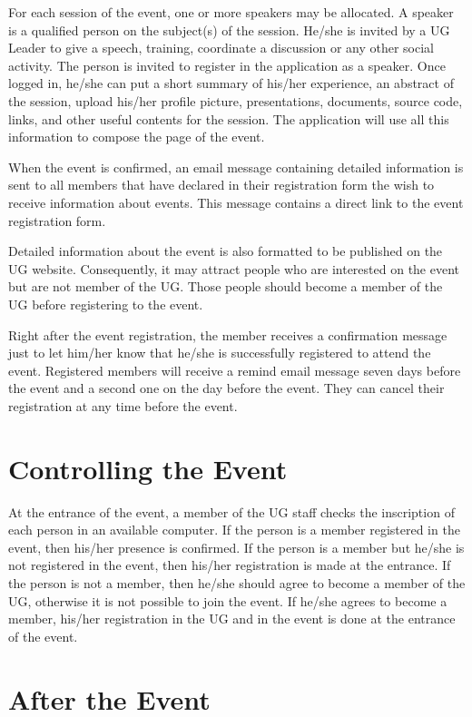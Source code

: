 \documentclass[envcountsame,envcountchap]{svmono}
\begin{document}
For each session of the event, one or more speakers may be allocated. A speaker is a qualified person on the subject(s) of the session. He/she is invited by a UG Leader to give a speech, training, coordinate a discussion or any other social activity. The person is invited to register in the application as a speaker.  Once logged in, he/she can put a short summary of his/her experience, an abstract of the session, upload his/her profile picture, presentations, documents, source code, links, and other useful contents for the session. The application will use all this information to compose the page of the event.

When the event is confirmed, an email message containing detailed information is sent to all members that have declared in their registration form the wish to receive information about events. This message contains a direct link to the event registration form.

Detailed information about the event is also formatted to be published on the UG website. Consequently, it may attract people who are interested on the event but are not member of the UG. Those people should become a member of the UG before registering to the event.

Right after the event registration, the member receives a confirmation message just to let him/her know that he/she is successfully registered to attend the event. Registered members will receive a remind email message seven days before the event and a second one on the day before the event. They can cancel their registration at any time before the event.

\section{Controlling the Event}

At the entrance of the event, a member of the UG staff checks the inscription of each person in an available computer. If the person is a member registered in the event, then his/her presence is confirmed. If the person is a member but he/she is not registered in the event, then his/her registration is made at the entrance. If the person is not a member, then he/she should agree to become a member of the UG, otherwise it is not possible to join the event. If he/she agrees to become a member, his/her registration in the UG and in the event is done at the entrance of the event.

\section{After the Event}
\end{document}
